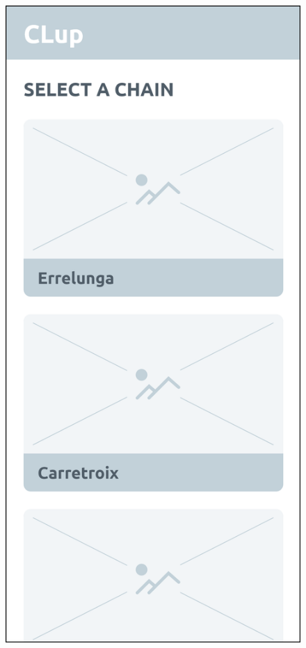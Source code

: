\documentclass[a4paper,oneside,11pt]{book}   %
\begin{document}
    \begin{figure}[H]
        \centering
        \hspace{0.025\textwidth}
        \begin{minipage}[b]{0.4\textwidth}
            \includegraphics[width=\textwidth]{pictures/mockups/select_chain}

\end{minipage}
\end{figure}
\end{document}
